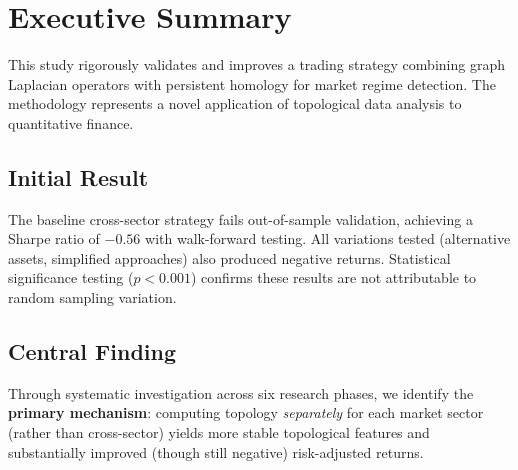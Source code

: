 \documentclass[12pt,letterpaper]{article}
\begin{document}
\begin{abstract}
\noindent\textbf{Primary Contribution:} First rigorous verification that TDA-based trading strategies do not produce positive alpha, paired with a mathematical framework for topology stability that stands independent of trading performance.
\end{abstract}

\clearpage


\tableofcontents
\clearpage

\listoffigures
\clearpage

\listoftables
\clearpage


\section*{Executive Summary}

This study rigorously validates and improves a trading strategy combining graph Laplacian operators with persistent homology for market regime detection. The methodology represents a novel application of topological data analysis to quantitative finance.

\subsection*{Initial Result}

The baseline cross-sector strategy fails out-of-sample validation, achieving a Sharpe ratio of $-0.56$ with walk-forward testing. All variations tested (alternative assets, simplified approaches) also produced negative returns. Statistical significance testing ($p < 0.001$) confirms these results are not attributable to random sampling variation.

\subsection*{Central Finding}

Through systematic investigation across six research phases, we identify the \textbf{primary mechanism}: computing topology \textit{separately} for each market sector (rather than cross-sector) yields more stable topological features and substantially improved (though still negative) risk-adjusted returns.
\end{document}
